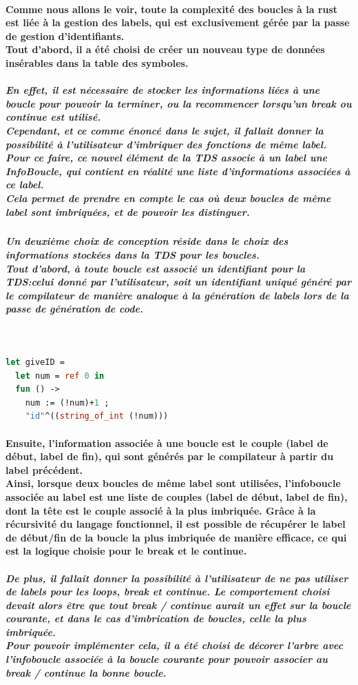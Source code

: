 \documentclass[french]{article}
\begin{document}
\paragraph*{Comme nous allons le voir, toute la complexité des boucles à la rust est liée à la gestion des labels, qui est exclusivement gérée par la passe de gestion d'identifiants.\\
Tout d'abord, il a été choisi de créer un nouveau type de données insérables dans la table des symboles.}
\subparagraph*{En effet, il est nécessaire de stocker les informations liées à une boucle pour pouvoir la terminer, ou la recommencer
lorsqu'un break ou continue est utilisé.\\
Cependant, et ce comme énoncé dans le sujet, il fallait donner la possibilité à l'utilisateur d'imbriquer des fonctions de même label.\\
Pour ce faire, ce nouvel élément de la TDS associe à un label une InfoBoucle, qui contient en réalité une liste d'informations associées à ce label.\\
Cela permet de prendre en compte le cas où deux boucles de même label sont imbriquées, et de pouvoir les distinguer. \\} %
\subparagraph*{Un deuxième choix de conception réside dans le choix des informations stockées dans la TDS pour les boucles.\\
Tout d'abord, à toute boucle est associé un identifiant pour la TDS:\@soit celui donné par l'utilisateur, soit un identifiant uniqué généré par le compilateur
de manière analoque à la génération de labels lors de la passe de génération de code.}
\,
\begin{lstlisting}[language=Ocaml]
let giveID = 
  let num = ref 0 in
  fun () ->
    num := (!num)+1 ;
    "id"^((string_of_int (!num)))
\end{lstlisting}
\paragraph*{Ensuite, l'information associée à une boucle est le couple (label de début, label de fin), qui sont générés par le compilateur à partir du label précédent. \\
Ainsi, lorsque deux boucles de même label sont utilisées, l'infoboucle associée au label est une liste de couples 
(label de début, label de fin), dont la tête est le couple associé à la plus imbriquée.
Grâce à la récursivité du langage fonctionnel, il est possible de récupérer le label de début/fin de la boucle la plus imbriquée de manière efficace,
ce qui est la logique choisie pour le break et le continue.}
\subparagraph*{De plus, il fallait donner la possibilité à l'utilisateur de ne pas utiliser de labels pour les loops, break et continue. Le comportement
choisi devait alors être que tout break / continue aurait un effet sur la boucle courante, et dans le cas d'imbrication de boucles, celle la 
plus imbriquée.\\
Pour pouvoir implémenter cela, il a été choisi de \textit{décorer l'arbre} avec l'infoboucle associée à la boucle courante pour pouvoir associer au break / continue
la bonne boucle.}
\end{document}
